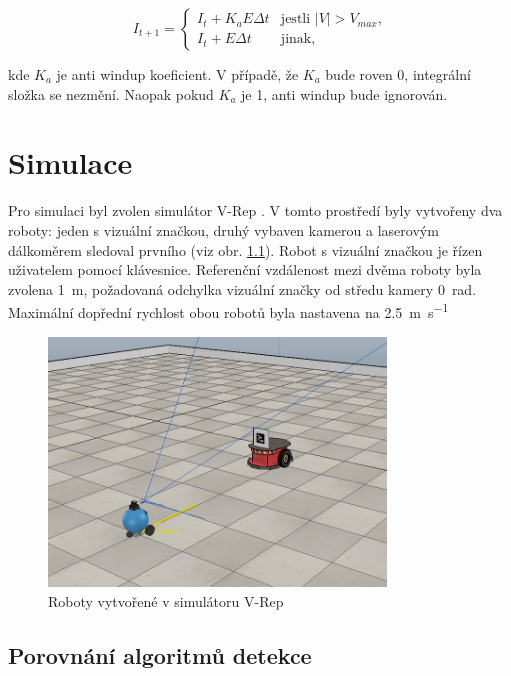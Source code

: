 \documentclass[twoside]{ctuthesis}
\theoremstyle{plain}
\theoremstyle{definition}
\theoremstyle{note}
\begin{document}
\begin{equation}
I_{t+1} = \left\{
	\begin{array}{ll}
	I_t + K_aE\Delta t &\textrm{jestli $\left|V\right| > V_{max}$,}\\
	I_t + E\Delta t & \textrm{jinak,}
	\end{array}
	\right.
\end{equation}

kde $K_a$ je anti windup koeficient. V případě, že $K_a$ bude roven 0, integrální složka se nezmění. Naopak pokud $K_a$ je 1, anti windup bude ignorován.
\chapter{Simulace}
\label{simulace}

Pro simulaci byl zvolen simulátor V-Rep \cite{cite:15}. V tomto prostředí byly vytvořeny dva roboty: jeden s vizuální značkou, druhý vybaven kamerou a laserovým dálkoměrem sledoval prvního (viz obr. \ref{robots}). Robot s vizuální značkou je řízen uživatelem pomocí klávesnice. Referenční vzdálenost mezi dvěma roboty byla zvolena \SI{1}{\meter}, požadovaná odchylka vizuální značky od středu kamery \SI{0}{\radian}. Maximální dopřední rychlost obou robotů byla nastavena na \SI{2.5}{\meter\per\second}

\begin{figure}
	\caption{Roboty vytvořené v simulátoru V-Rep}

	\label{robots}
	\includegraphics[width=0.8\textwidth]{images/5/robots.png}
\end{figure}
\section{Porovnání algoritmů detekce}
\end{document}
